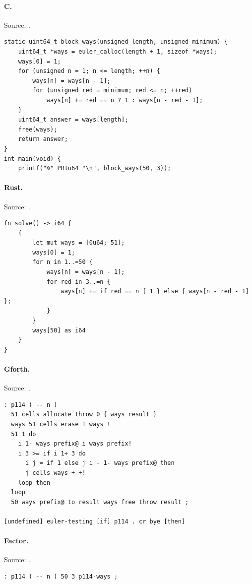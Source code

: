 \paragraph{C.} Source: .
\begin{lstlisting}
static uint64_t block_ways(unsigned length, unsigned minimum) {
    uint64_t *ways = euler_calloc(length + 1, sizeof *ways);
    ways[0] = 1;
    for (unsigned n = 1; n <= length; ++n) {
        ways[n] = ways[n - 1];
        for (unsigned red = minimum; red <= n; ++red)
            ways[n] += red == n ? 1 : ways[n - red - 1];
    }
    uint64_t answer = ways[length];
    free(ways);
    return answer;
}
int main(void) {
    printf("%" PRIu64 "\n", block_ways(50, 3));
\end{lstlisting}

\paragraph{Rust.} Source: .
\begin{lstlisting}
fn solve() -> i64 {
    {
        let mut ways = [0u64; 51];
        ways[0] = 1;
        for n in 1..=50 {
            ways[n] = ways[n - 1];
            for red in 3..=n {
                ways[n] += if red == n { 1 } else { ways[n - red - 1] };
            }
        }
        ways[50] as i64
    }
}
\end{lstlisting}

\paragraph{Gforth.} Source: .
\begin{lstlisting}
: p114 ( -- n )
  51 cells allocate throw 0 { ways result }
  ways 51 cells erase 1 ways !
  51 1 do
    i 1- ways prefix@ i ways prefix!
    i 3 >= if i 1+ 3 do
      i j = if 1 else j i - 1- ways prefix@ then
      j cells ways + +!
    loop then
  loop
  50 ways prefix@ to result ways free throw result ;

[undefined] euler-testing [if] p114 . cr bye [then]
\end{lstlisting}

\paragraph{Factor.} Source: .
\begin{lstlisting}
: p114 ( -- n ) 50 3 p114-ways ;
\end{lstlisting}

